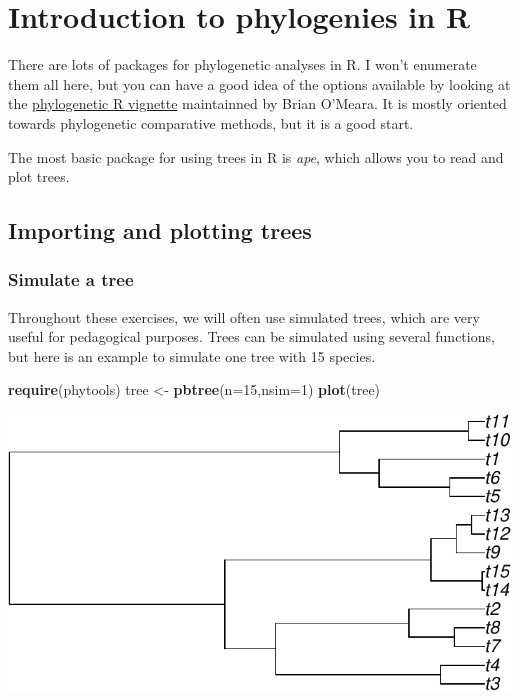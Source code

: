 \documentclass[
]{book}
\newenvironment{Shaded}{\begin{snugshade}}{\end{snugshade}}
\newcommand{\AttributeTok}[1]{\textcolor[rgb]{0.13,0.29,0.53}{#1}}
\newcommand{\DecValTok}[1]{\textcolor[rgb]{0.00,0.00,0.81}{#1}}
\newcommand{\FunctionTok}[1]{\textcolor[rgb]{0.13,0.29,0.53}{\textbf{#1}}}
\newcommand{\NormalTok}[1]{#1}
\newcommand{\OtherTok}[1]{\textcolor[rgb]{0.56,0.35,0.01}{#1}}
\begin{document}
\chapter{Introduction to phylogenies in R}\label{trees}

There are lots of packages for phylogenetic analyses in R. I won't enumerate them all here, but you can have a good idea of the options available by looking at the \href{http://cran.r-project.org/web/views/Phylogenetics.html}{phylogenetic R vignette} maintainned by Brian O'Meara. It is mostly oriented towards phylogenetic comparative methods, but it is a good start.

The most basic package for using trees in R is \emph{ape}, which allows you to read and plot trees.

\section{Importing and plotting trees}\label{importing-and-plotting-trees}

\subsection{Simulate a tree}\label{simulate-a-tree}

Throughout these exercises, we will often use simulated trees, which are very useful for pedagogical purposes. Trees can be simulated using several functions, but here is an example to simulate one tree with 15 species.

\begin{Shaded}
\begin{Highlighting}[]
\FunctionTok{require}\NormalTok{(phytools)}
\NormalTok{tree }\OtherTok{\textless{}{-}} \FunctionTok{pbtree}\NormalTok{(}\AttributeTok{n=}\DecValTok{15}\NormalTok{,}\AttributeTok{nsim=}\DecValTok{1}\NormalTok{)}
\FunctionTok{plot}\NormalTok{(tree)}
\end{Highlighting}
\end{Shaded}

\includegraphics{pcm-workshop_files/figure-latex/Simulate Pure-Birth Tree-1.pdf}
\end{document}
